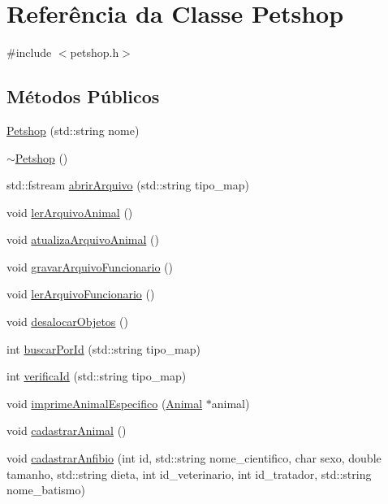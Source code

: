 \hypertarget{classPetshop}{}\section{Referência da Classe Petshop}
\label{classPetshop}


{\ttfamily \#include $<$petshop.\+h$>$}

\subsection*{Métodos Públicos}
\begin{DoxyCompactItemize}
\item 
\hyperlink{classPetshop_a6ea911ff6ce0a63275d33db172086f69}{Petshop} (std\+::string nome)
\item 
\hyperlink{classPetshop_a3ec4d2ba5d85e86d63121b4efd199de2}{$\sim$\+Petshop} ()
\item 
std\+::fstream \hyperlink{classPetshop_a3e0c8fc8c46784fcd0bc7d650ba7dcec}{abrir\+Arquivo} (std\+::string tipo\+\_\+map)
\item 
void \hyperlink{classPetshop_a89862e7eff30a1241775ee836bc7a450}{ler\+Arquivo\+Animal} ()
\item 
void \hyperlink{classPetshop_a24cfb15a9aed53e6aea5f5faf6e202b2}{atualiza\+Arquivo\+Animal} ()
\item 
void \hyperlink{classPetshop_aead26f84cad6db0a70e75112ba3fe58d}{gravar\+Arquivo\+Funcionario} ()
\item 
void \hyperlink{classPetshop_a1c810571e6044321fa00c7b2ccac37d5}{ler\+Arquivo\+Funcionario} ()
\item 
void \hyperlink{classPetshop_af6269c2a28c849dc2ebf21e7438fec53}{desalocar\+Objetos} ()
\item 
int \hyperlink{classPetshop_ae36b7c1babae414e65a2d22593005494}{buscar\+Por\+Id} (std\+::string tipo\+\_\+map)
\item 
int \hyperlink{classPetshop_a84b268022826f11ab6ce36579d243d1b}{verifica\+Id} (std\+::string tipo\+\_\+map)
\item 
void \hyperlink{classPetshop_a5b18b5e2667f00547486ec1f01a4f639}{imprime\+Animal\+Especifico} (\hyperlink{classAnimal}{Animal} $\ast$animal)
\item 
void \hyperlink{classPetshop_ac06e79f236e5305d10553566095001da}{cadastrar\+Animal} ()
\item 
void \hyperlink{classPetshop_abe75c19422842cbb74163813bc99743b}{cadastrar\+Anfibio} (int id, std\+::string nome\+\_\+cientifico, char sexo, double tamanho, std\+::string dieta, int id\+\_\+veterinario, int id\+\_\+tratador, std\+::string nome\+\_\+batismo)

\end{DoxyCompactItemize}
